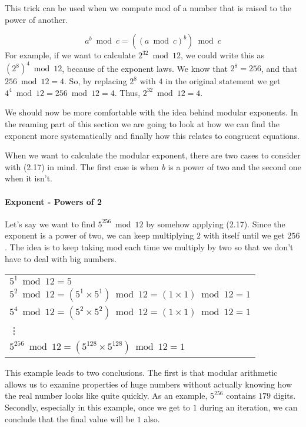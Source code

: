 This trick can be used when we compute mod of a number that is raised to the power of another.

\begin{equation}
a^b \bmod c = ((a\bmod c)^b)\bmod c
\end{equation}
For example, if we want to calculate $2^{32} \bmod 12$, we could write this as $(2^8)^4\bmod 12$, because of the exponent laws. We know that $2^8=256$, and that $256\bmod 12=4$. So, by replacing $2^8$ with $4$ in the original statement we get $4^4\bmod 12 =256\bmod 12=4$. Thus, $2^{32} \bmod 12 = 4$.

We should now be more comfortable with the idea behind modular exponents. In the reaming part of this section we are going to look at how we can find the exponent more systematically and finally how this relates to congruent equations.
  
When we want to calculate the modular exponent, there are two cases to consider with (2.17) in mind. The first case is when \textit{b} is a power of two  and the second one when it isn't.

\paragraph{Exponent - Powers of 2} Let's say we want to find $5^{256} \bmod 12$ by somehow applying (2.17). Since the exponent is a power of two, we can keep multiplying $2$ with itself until we get $256$. The idea is to keep taking mod each time we multiply by two so that we don't have to deal with big numbers.
\begin{center}
\begin{tabular}{|l|}
\hline
$5^1 \bmod 12 = 5$\\
$5^2 \bmod 12 = (5^1 \times 5^1) \bmod 12 = (1\times 1)\bmod 12= 1$\\
$5^4 \bmod 12 = (5^2 \times 5^2) \bmod 12 = (1\times 1)\bmod 12= 1$\\
\vdots\\
$5^{256} \bmod 12 =( 5^{128} \times 5^{128}) \bmod 12 =1$\\
\hline
\end{tabular}
\end{center}
This example leads to two conclusions. The first is that modular arithmetic allows us to examine properties of huge numbers without actually knowing how the real number looks like quite quickly. As an example, $5^{256}$ contains $179$ digits. Secondly, especially in this example, once we get to $1$ during an iteration, we can conclude that the final value will be $1$ also. 


